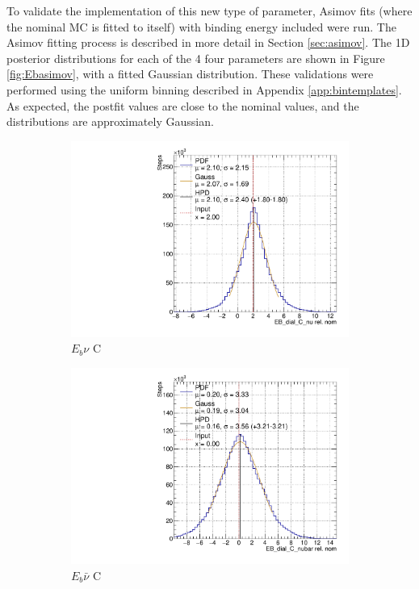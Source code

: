 To validate the implementation of this new type of parameter, Asimov fits\cite{asmv} (where the nominal MC is fitted to itself) with binding energy included were run. The Asimov fitting process is described in more detail in Section \ref{sec:asimov}. The 1D posterior distributions for each of the 4 four parameters are shown in Figure \ref{fig:Ebasimov}, with a fitted Gaussian distribution. These validations were performed using the uniform binning described in Appendix \ref{app:bintemplates}. As expected, the postfit values are close to the nominal values, and the distributions are approximately Gaussian. 

\begin{figure}
\centering
\begin{subfigure}{.48\textwidth}
  \centering
  \includegraphics[width=0.73\linewidth]{figs/EB_dial_C_nuAsmv}
  \caption{$E_{b}\nu$ C}
\end{subfigure}
\begin{subfigure}{.48\textwidth}
  \centering
  \includegraphics[width=0.73\linewidth]{figs/EB_dial_C_nubarAsmv}
  \caption{$E_{b}\bar{\nu}$ C}
\end{subfigure} \\
\begin{subfigure}{.48\textwidth}

\end{subfigure}
\end{figure}
